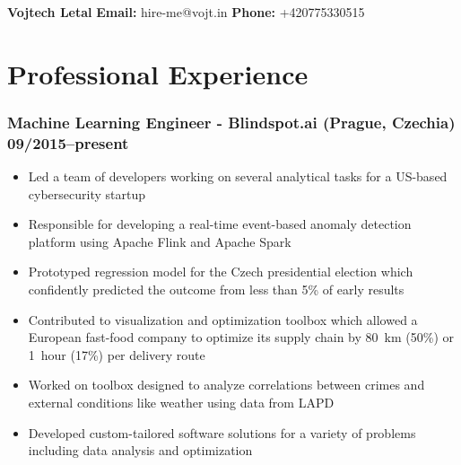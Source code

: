 \documentclass[10pt]{article}
\date{}
\begin{document}
\clearpage
\thispagestyle{empty}
{\center\bfseries\huge Vojtech Letal}
\hfill
{\bf Email:} hire-me@vojt.in
{\bf Phone:} +420775330515


\section*{Professional Experience}
\subsubsection*{\bf Machine Learning Engineer - Blindspot.ai (Prague, Czechia) \hfill 09/2015--present}
	 \begin{itemize}
		\setlength\itemsep{-0.25em}
		\item Led a team of developers working on several analytical tasks for a US-based cybersecurity startup
		\item Responsible for developing a real-time event-based anomaly detection platform using Apache Flink and Apache Spark
		\item Prototyped regression model for the Czech presidential election which confidently predicted the outcome from less than 5\% of early results
		\item Contributed to visualization and optimization toolbox which allowed a European fast-food company to optimize its supply chain by 80~km (50\%) or 1~hour (17\%) per delivery route
		\item Worked on toolbox designed to analyze correlations between crimes and external conditions like weather using data from LAPD
		\item Developed custom-tailored software solutions for a variety of problems including data analysis and optimization
	 \end{itemize}
\end{document}
